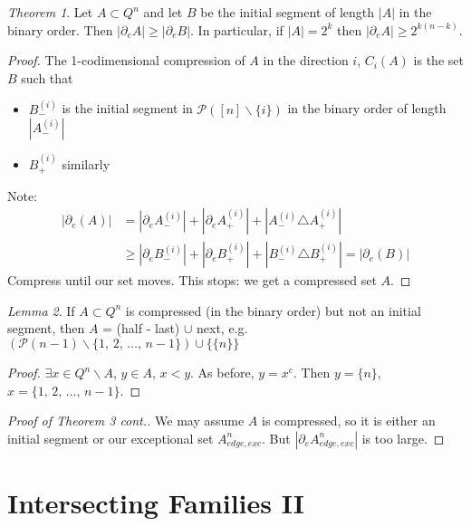 \documentclass[a4paper]{article}
\theoremstyle{definition}
\theoremstyle{remark}
\theoremstyle{default}
\newtheorem{theorem}{Theorem}
\newtheorem{lemma}[theorem]{Lemma}
\newcommand*\abs[1]{\left|#1\right|}
\begin{document}
\begin{theorem}
	Let $A \subset Q^n$ and let $B$ be the initial segment of length $\abs{A}$ in the binary order.
	Then $\abs{\partial_e A} \geq \abs{\partial_e B}$.
	In particular, if $\abs{A}=2^k$ then $\abs{\partial_e A} \geq 2^{k(n-k)}$.
\end{theorem}
\begin{proof}\renewcommand{\qedsymbol}{}
	The 1-codimensional compression of $A$ in the direction $i$, $C_i(A)$ is the set $B$ such that
	\begin{itemize}
		\item $B_-^{(i)}$ is the initial segment in $\mathcal{P}([n]\backslash\{i\})$ in the binary order of length $\abs{A_-^{(i)}}$
		\item $B_+^{(i)}$ similarly
	\end{itemize}
	Note: 
	\begin{align*}
		\abs{\partial_e(A)} &= \abs{\partial_e A_-^{(i)}} + \abs{\partial_e A_+^{(i)}} + \abs{A_-^{(i)} \triangle A_+^{(i)}} \\
		&\geq \abs{\partial_e B_-^{(i)}} + \abs{\partial_e B_+^{(i)}} + \abs{B_-^{(i)} \triangle B_+^{(i)}} = \abs{\partial_e(B)}
	\end{align*}
	Compress until our set moves.
	This stops: we get a compressed set $A$.
\end{proof}

\begin{lemma}
	If $A \subset Q^n$ is compressed (in the binary order) but not an initial segment,
	then $A$ = (half - last) $\cup$ next, e.g. $(\mathcal{P}(n-1)\backslash \{1,\, 2,\, \dots,\, n-1\}) \cup \{\{n\}\}$
\end{lemma}
\begin{proof}
	$\exists x \in Q^n \backslash A$, $y \in A$, $x < y$.
	As before, $y = x^c$.
	Then $y = \{n\}$, $x = \{1,\, 2,\, \dots, \, n-1\}$.
\end{proof}

\begin{proof}[Proof of Theorem 3 cont.]
	We may assume $A$ is compressed,
	so it is either an initial segment or our exceptional set $A^n_{edge, exc}$.
	But $\abs{\partial_e A^n_{edge, exc}}$ is too large.
\end{proof}

\section{Intersecting Families II}
\setcounter{theorem}{0}
\end{document}
